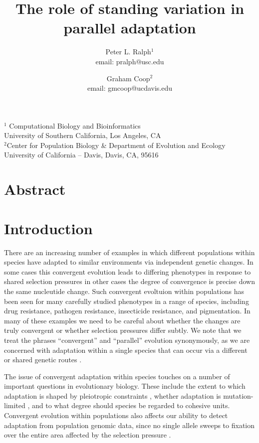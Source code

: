 \documentclass{article}
\title{The role of standing variation in parallel adaptation}
\author{Peter L. Ralph$^1$ \\ email: pralph@usc.edu  \and Graham Coop$^2$ \\ email: gmcoop@ucdavis.edu }
\begin{document}
\maketitle
\date{}

\begin{center}

$^1$ Computational Biology and Bioinformatics \\ 
University of Southern California, Los Angeles, CA \\
$^2$Center for Population Biology \& Department of Evolution and Ecology \\ 
University of California -- Davis, Davis, CA, 95616
\end{center}

\section*{Abstract}

\section{Introduction}

There are an increasing number of examples in which
different populations within species have
adapted to similar environments via independent genetic changes. 
In some cases this convergent evolution leads to differing phenotypes
in response to shared selection pressures
\citep{} in other cases the degree of convergence is precise down the
same nucleutide change. 
Such convergent evoltuion within populations has been seen for many
carefully studied phenotypes in a range of species, 
including drug resistance, pathogen resistance, insecticide resistance, and pigmentation. 
In many of these examples we 
need to be careful about whether the changes are truly convergent or
whether selection pressures differ subtly. 
We note that we treat the phrases ``convergent'' and ``parallel'' evolution
synonymously, as we are concerned with adaptation within a single
species that can occur via a different or shared genetic routes \citep[see][for more discussion]{Arendt:08}.

The issue of convergent adaptation within species touches on a number
of important questions in evolutionary biology. 
These include the extent to which adaptation is shaped by pleiotropic constraints \citep{Haldane:book,Orr:05},
whether adaptation is mutation-limited \citep{Bradshaw:91,karasov2010}, 
and to what degree should species be regarded to cohesive units. 
Convergent evolution within populations 
also affects our ability to detect adaptation from population genomic data,
since no single allele sweeps to fixation over the entire area affected by the selection pressure \citep{softsweepsIII}.
\end{document}
